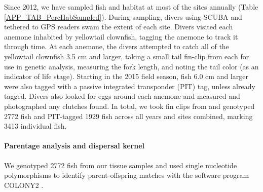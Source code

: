 \documentclass[12pt, oneside]{article}   	%
\begin{document}
Since 2012, we have sampled fish and habitat at most of the sites annually (Table \ref{APP_TAB_PercHabSampled}). During sampling, divers using SCUBA and tethered to GPS readers swam the extent of each site. Divers visited each anemone inhabited by yellowtail clownfish, tagging the anemone to track it through time. At each anemone, the divers attempted to catch all of the yellowtail clownfish 3.5 cm and larger, taking a small tail fin-clip from each for use in genetic analysis, measuring the fork length, and noting the tail color (as an indicator of life stage). Starting in the 2015 field season, fish 6.0 cm and larger were also tagged with a passive integrated transponder (PIT) tag, unless already tagged. Divers also looked for eggs around each anemone and measured and photographed any clutches found. In total, we took fin clips from and genotyped 2772 fish and PIT-tagged 1929 fish across all years and sites combined, marking 3413 individual fish. %

\paragraph*{Parentage analysis and dispersal kernel}  %

We genotyped 2772 fish from our tissue samples and used single nucleotide polymorphisms to identify parent-offspring matches with the software program COLONY2 \citep{wang2012computationally} \citep[details on genotyping and parentage analysis in][]{catalanoInPrepconnectivity}. %
\end{document}
